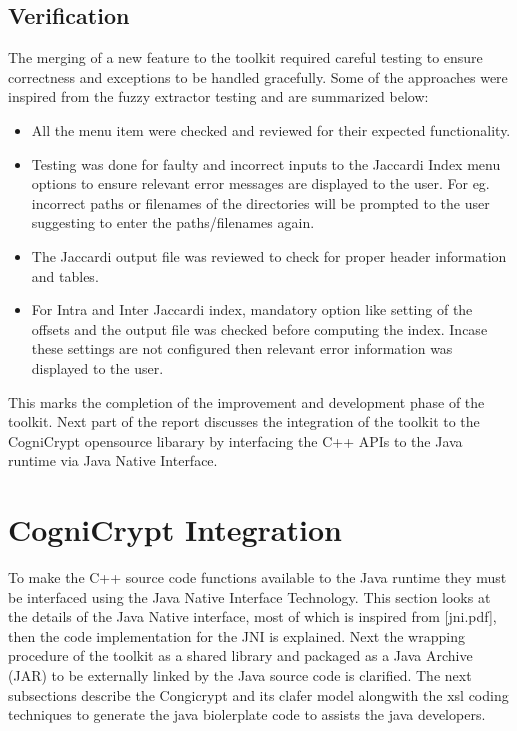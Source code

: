 \subsection{Verification}
The merging of a new feature to the toolkit required careful testing to ensure correctness and exceptions to be handled gracefully. Some of the approaches were inspired from the fuzzy extractor testing and are summarized below:
\begin{itemize}
	\item All the menu item were checked and reviewed for their expected functionality.
	\item Testing was done for faulty and incorrect inputs to the Jaccardi Index menu options to ensure relevant error messages are displayed to the user. For eg. incorrect paths or filenames of the directories will be prompted to the user suggesting to enter the paths/filenames again.
	\item The Jaccardi output file was reviewed to check for proper header information and tables.
	\item For Intra and Inter Jaccardi index, mandatory option like setting of the offsets and the output file was checked before computing the index. Incase these settings are not configured then relevant error information was displayed to the user.
\end{itemize}

This marks the completion of the improvement and development phase of the toolkit. Next part of the report discusses the integration of the toolkit to the CogniCrypt opensource libarary by interfacing the C++ APIs to the Java runtime via Java Native Interface.

\section{CogniCrypt Integration}

To make the C++ source code functions available to the Java runtime they must be interfaced using the Java Native Interface Technology. This section looks at the details of the Java Native interface, most of which is inspired from [jni.pdf], then the code implementation for the JNI is explained. Next the wrapping procedure of the toolkit as a shared library and packaged as a Java Archive (JAR) to be externally linked by the Java source code is clarified. The next subsections describe the Congicrypt and its clafer model
alongwith the xsl coding techniques to generate the java biolerplate code to assists the java developers.

